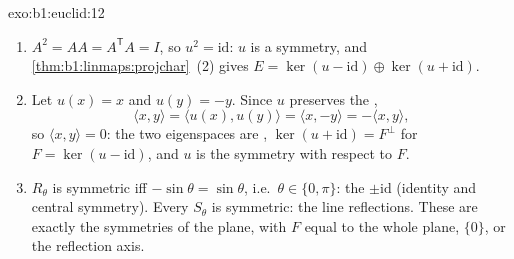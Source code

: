 \begin{solution}{exo:b1:euclid:12}
\begin{enumerate}
  \item $A^2 = A A = A^{\mathsf T} A = I$, so $u^2 =
        \mathrm{id}$: $u$ is a symmetry, and
        \cref{thm:b1:linmaps:projchar}~(2) gives $E = \ker(u -
        \mathrm{id}) \oplus \ker(u + \mathrm{id})$.
  \item Let $u(x) = x$ and $u(y) = -y$. Since $u$ preserves the
        ,
        \[
        \langle x, y\rangle = \langle u(x), u(y)\rangle
        = \langle x, -y\rangle = -\langle x, y\rangle ,
        \]
        so $\langle x, y\rangle = 0$: the two eigenspaces are
        , $\ker(u + \mathrm{id}) = F^\perp$ for $F =
        \ker(u - \mathrm{id})$, and $u$ is the 
        symmetry with respect to $F$.
  \item $R_\theta$ is symmetric iff $-\sin\theta = \sin\theta$,
        i.e.\ $\theta \in \{0, \pi\}$: the  $\pm\mathrm{id}$
        (identity and central symmetry). Every $S_\theta$ is
        symmetric: the line reflections. These are exactly the
         symmetries of the plane, with $F$ equal to
        the whole plane, $\{0\}$, or the reflection axis.
\end{enumerate}
\end{solution}


